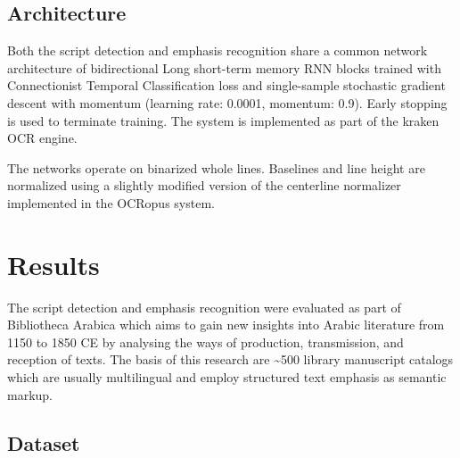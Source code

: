 \subsection{Architecture}


Both the script detection and emphasis recognition share a common network
architecture of bidirectional Long short-term memory RNN blocks trained with
Connectionist Temporal Classification loss and single-sample stochastic
gradient descent with momentum (learning rate: 0.0001, momentum: 0.9). Early
stopping is used to terminate training. The system is implemented as part of
the kraken OCR engine.

The networks operate on binarized whole lines. Baselines and line height are
normalized using a slightly modified version of the centerline normalizer
implemented in the OCRopus system.

\section{Results}

The script detection and emphasis recognition were evaluated as part of
Bibliotheca Arabica which aims to gain new insights into Arabic literature from
1150 to 1850 CE by analysing the ways of production, transmission, and
reception of texts. The basis of this research are \textasciitilde 500 library
manuscript catalogs which are usually multilingual and employ structured text
emphasis as semantic markup.

\subsection{Dataset}

